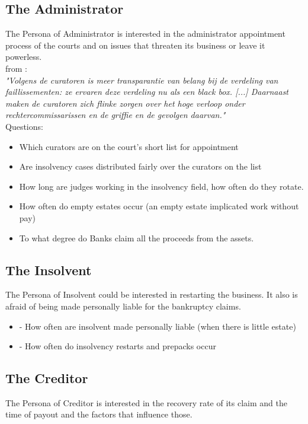 \subsection{The Administrator}
The Persona of Administrator is interested in the administrator appointment process of the courts and on issues that threaten its business or leave it powerless.\\

from \cite{samr_2017:1}:\\
\textit{"Volgens de curatoren is meer transparantie van belang
bij de verdeling van faillissementen: ze ervaren deze
verdeling nu als een black box. [...] Daarnaast maken de curatoren
zich flinke zorgen over het hoge verloop onder rechtercommissarissen
en de griffie en de gevolgen daarvan."}\\

Questions:
\begin{itemize}
	\item Which curators are on the court’s short list for appointment
	\item Are insolvency cases distributed fairly over the curators on the list
	\item How long are judges working in the insolvency field, how often do they rotate.
	\item How often do empty estates occur (an empty estate implicated work without pay)
	\item To what degree do Banks claim all the proceeds from the assets.
\end{itemize}

\subsection{The Insolvent}
The Persona of Insolvent could be interested in restarting the business. It also is afraid of being made personally liable for the bankruptcy claims.

\begin{itemize}
	\item -	How often are insolvent made personally liable (when there is little estate)
	\item -	How often do insolvency restarts and prepacks occur
\end{itemize}

\subsection{The Creditor}
The Persona of Creditor is interested in the recovery rate of its claim and the time of payout and the factors that influence those.

